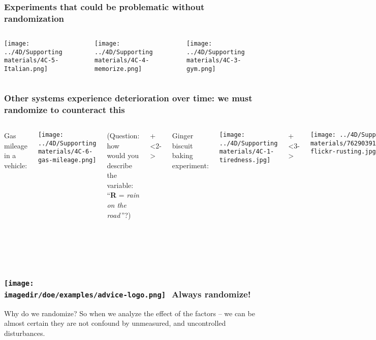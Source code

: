 \begin{frame}\frametitle{Experiments that could be problematic without randomization}
	\begin{columns}[T]
			\texttt{[image: ../4D/Supporting materials/4C-5-Italian.png]}
		
			\texttt{[image: ../4D/Supporting materials/4C-4-memorize.png]}
		
			\texttt{[image: ../4D/Supporting materials/4C-3-gym.png]}
			
	\end{columns}
\end{frame}

\begin{frame}\frametitle{Other systems experience deterioration over time: we must randomize to counteract this}
	\begin{columns}[T]
			Gas mileage in a vehicle: 
			
			\texttt{[image: ../4D/Supporting materials/4C-6-gas-mileage.png]}
			
			\vspace{2.5cm}
			{\scriptsize (Question: how would you describe the variable: ``\textbf{R} = \emph{rain on the road}\,''?)}
		
			
			\onslide+<2->{
				Ginger biscuit baking experiment: 
			
				\texttt{[image: ../4D/Supporting materials/4C-1-tiredness.jpg]}
			}
		
		
			\onslide+<3->{
				\texttt{[image: ../4D/Supporting materials/7629039140\_c2e2cde0c8\_o-flickr-rusting.jpg]}
				
				\vspace{-0.52cm}
				{\tiny \href{https://secure.flickr.com/photos/mikecogh/7629039140}{Flickr: mikecogh}}
				
				
				{\scriptsize 
					This is a slow moving disturbance: we must account for it though if we run experiments that span several months, or years.
				}
			}
			
	\end{columns}
\end{frame}

\begin{frame}\frametitle{\texttt{[image: \\imagedir/doe/examples/advice-logo.png]}\,\, Always randomize!}
	
	\begin{exampleblock}{Why do we randomize?}
		So when we analyze the effect of the factors -- we can be almost certain they are not confound by unmeasured, and uncontrolled disturbances.
	\end{exampleblock}
	
\end{frame}

